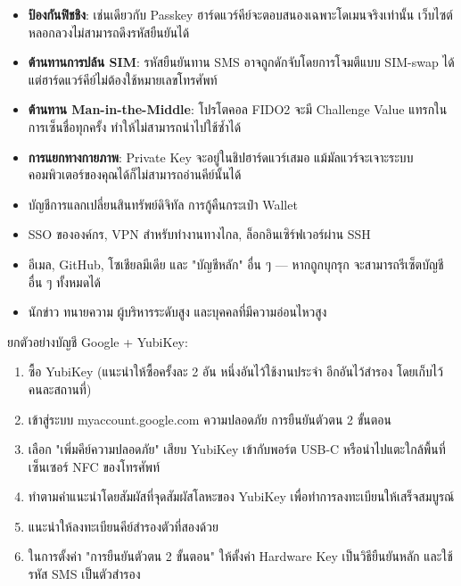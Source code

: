 
\begin{itemize}
  \item \textbf{ป้องกันฟิชชิง}: เช่นเดียวกับ Passkey ฮาร์ดแวร์คีย์จะตอบสนองเฉพาะโดเมนจริงเท่านั้น เว็บไซต์หลอกลวงไม่สามารถดึงรหัสยืนยันได้
  \item \textbf{ต้านทานการปล้น SIM}: รหัสยืนยันทาน SMS อาจถูกดักจับโดยการโจมตีแบบ SIM-swap ได้ แต่ฮาร์ดแวร์คีย์ไม่ต้องใช้หมายเลขโทรศัพท์
  \item \textbf{ต้านทาน Man-in-the-Middle}: โปรโตคอล FIDO2 จะมี Challenge Value แทรกในการเซ็นชื่อทุกครั้ง ทำให้ไม่สามารถนำไปใช้ซ้ำได้
  \item \textbf{การแยกทางกายภาพ}: Private Key จะอยู่ในชิปฮาร์ดแวร์เสมอ แม้มัลแวร์จะเจาะระบบคอมพิวเตอร์ของคุณได้ก็ไม่สามารถอ่านคีย์นั้นได้
\end{itemize}


\begin{itemize}
  \item บัญชีการแลกเปลี่ยนสินทรัพย์ดิจิทัล การกู้คืนกระเป๋า Wallet
  \item SSO ขององค์กร, VPN สำหรับทำงานทางไกล, ล็อกอินเซิร์ฟเวอร์ผ่าน SSH
  \item อีเมล, GitHub, โซเชียลมีเดีย และ "บัญชีหลัก" อื่น ๆ — หากถูกบุกรุก จะสามารถรีเซ็ตบัญชีอื่น ๆ ทั้งหมดได้
  \item นักข่าว ทนายความ ผู้บริหารระดับสูง และบุคคลที่มีความอ่อนไหวสูง
\end{itemize}


ยกตัวอย่างบัญชี Google + YubiKey:

\begin{enumerate}
  \item ซื้อ YubiKey (แนะนำให้ซื้อครั้งละ 2 อัน หนึ่งอันไว้ใช้งานประจำ อีกอันไว้สำรอง โดยเก็บไว้คนละสถานที่)
  \item เข้าสู่ระบบ myaccount.google.com ความปลอดภัย การยืนยันตัวตน 2 ขั้นตอน
  \item เลือก "เพิ่มคีย์ความปลอดภัย" เสียบ YubiKey เข้ากับพอร์ต USB-C หรือนำไปแตะใกล้พื้นที่เซ็นเซอร์ NFC ของโทรศัพท์
  \item ทำตามคำแนะนำโดยสัมผัสที่จุดสัมผัสโลหะของ YubiKey เพื่อทำการลงทะเบียนให้เสร็จสมบูรณ์
  \item แนะนำให้ลงทะเบียนคีย์สำรองตัวที่สองด้วย
  \item ในการตั้งค่า "การยืนยันตัวตน 2 ขั้นตอน" ให้ตั้งค่า Hardware Key เป็นวิธียืนยันหลัก และใช้รหัส SMS เป็นตัวสำรอง
\end{enumerate}


